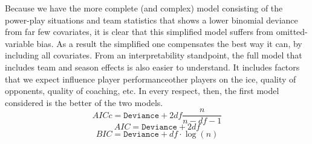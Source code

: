 \documentclass[11pt, fleqn]{article}
\begin{document}
Because we have the more complete (and complex) model consisting of the power-play situations and team statistics that shows a lower binomial deviance from far few covariates, it is clear that this simplified model suffers from omitted-variable bias.  As a result the simplified one compensates the best way it can, by including all covariates. From an interpretability standpoint, the full model that includes team and season effects is also easier to understand. It includes factors that we expect influence player performance\textemdash other players on the ice, quality of opponents, quality of coaching, etc. In every respect, then, the first model considered is the better of the two models.
\begin{equation}
  AICc = \texttt{Deviance} + 2df\frac{n}{n-df-1}
  \label{eq:AICc}
\end{equation}
\begin{equation}
  AIC = \texttt{Deviance} + 2df
  \label{eq:AIC}
\end{equation}
\begin{equation}
  BIC = \texttt{Deviance} + df \cdot \log(n)
  \label{eq:BIC}
\end{equation}
\end{document}
